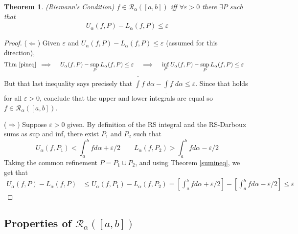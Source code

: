 \documentclass[12pt]{article}
\numberwithin{equation}{section} %
\theoremstyle{plain}
\newtheorem{thm}{Theorem}[section]
\theoremstyle{definition}
\theoremstyle{remark}
\newcommand{\sR}{\mathscr{R}}
\begin{document}
\begin{thm}
\emph{(Riemann's Condition)}
\label{riemcond}
$f \in \mathscr{R}_\alpha([a,b])$ iff
$\forall\varepsilon>0$ there $\exists P$ such that
\begin{align*}
  U_\alpha(f,P) - L_\alpha(f,P) \leq \varepsilon
\end{align*}
\end{thm}
\begin{proof}
($\Leftarrow$)
Given $\varepsilon$ and
$U_\alpha(f,P) - L_\alpha(f,P) \leq \varepsilon$
(assumed for this direction),
\begin{align*}
  \text{Thm~\ref{pineq}}\;\implies\quad
  U_\alpha(f,P) - \sup_P L_\alpha(f,P) &\leq \varepsilon
  \quad \implies\quad
  \inf_P U_\alpha(f,P) - \sup_P L_\alpha(f,P) \leq \varepsilon
\end{align*}
But that last inequality says precisely that
$\overline{\int} f\;d\alpha -
\underline{\int}f\;d\alpha\leq\varepsilon$.
Since that holds for all $\varepsilon>0$, conclude that the upper and
lower integrals are equal so $f\in\sR_\alpha([a,b])$.

($\Rightarrow$)
Suppose $\varepsilon>0$ given.
By definition of the RS integral and the RS-Darboux sums as sup and
inf, there exist $P_1$ and $P_2$ such that
\begin{equation}
    \label{p1}
    U_\alpha(f,P_1) < \int^b_a f d\alpha + \varepsilon/2 \qquad
    L_\alpha(f,P_2) > \int^b_a f d\alpha - \varepsilon/2
\end{equation}
Taking the common refinement $P=P_1\cup P_2$, and using Theorem
\ref{sumineq}, we get that
\begin{align*}
    U_\alpha(f,P) - L_\alpha(f,P) &\leq
    U_\alpha(f,P_1) - L_\alpha(f,P_2)
    = \left[\int^b_a f d\alpha + \varepsilon/2\right] -
        \left[\int^b_a f d\alpha -\varepsilon/2  \right]
    \leq \varepsilon
\end{align*}
\end{proof}

\subsection{Properties of $\mathscr{R}_\alpha([a,b])$}
\end{document}
